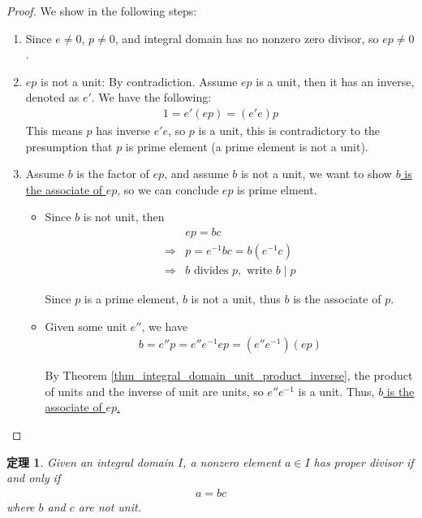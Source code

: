 \documentclass[utf8]{ctexbook}
\newtheorem{theorem}{定理}[section]
\begin{document}
\begin{proof}
We show in the following steps:
\begin{enumerate}
\item{Since $e \neq 0$, $p \neq 0$, and integral domain has no nonzero zero divisor, so $e p \neq 0$.}
\item{$e p $ is not a unit: By contradiction. Assume $e p$ is a unit, then it has an inverse, denoted as $e'$. We have the following:
\begin{align*}
1 = e' (e p) = (e' e ) p
\end{align*}
This means $p$ has inverse $e' e$, so $p$ is a unit, this is contradictory to the presumption that $p$ is prime element (a prime element is not a unit).}
\item{Assume $b$ is the factor of $e p$, and assume $b$ is not a unit, we want to show \underline{$b$ is the associate of $e p$}, so we can conclude $e p$ is prime elment.}
\begin{itemize}
\item{Since $b$ is not unit, then
\begin{align*}
& e p = b c  \\
\Longrightarrow & p = e^{-1} b c = b (e^{-1} c ) \\
\Longrightarrow & b \mbox{ divides } p, \mbox{ write } b \mid p
\end{align*}

Since $p$ is a prime element, $b$ is not a unit, thus $b$ is the associate of $p$.} 
\item{Given some unit $e''$, we have
\begin{align*}
b = e'' p = e'' e^{-1} e p = (e'' e^{-1} ) (e p)
\end{align*}

By Theorem \ref{thm_integral_domain_unit_product_inverse}, the product of units and the inverse of unit are units, so $e'' e^{-1} $ is a unit. Thus, \underline{$b$ is the associate of $e p$.}
}
\end{itemize}

\end{enumerate}
\end{proof}

\begin{theorem}\label{thm_integral_domain_proper_divisor_redef}
Given an integral domain $I$, a nonzero element $a \in I$ has proper divisor if and only if
\begin{align*}
a = b c
\end{align*}
where $b$ and $c$ are not unit.
\end{theorem}
\end{document}
